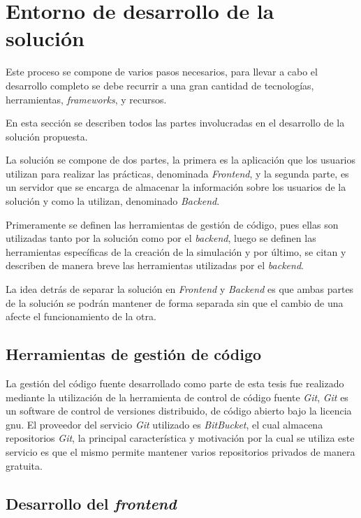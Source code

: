 \section{Entorno de desarrollo de la solución}

Este proceso se compone de varios pasos necesarios, para llevar a cabo el
desarrollo completo se debe recurrir a una gran cantidad de tecnologías,
herramientas, \textit{frameworks}, y recursos.

En esta sección se describen todos las partes involucradas en el desarrollo de
la solución propuesta. 

La solución se compone de dos partes, la primera es la aplicación que los
usuarios utilizan para realizar las prácticas, denominada \textit{Frontend}, y la segunda
parte, es un servidor que se encarga de almacenar la información sobre los
usuarios de la solución y como la utilizan, denominado \textit{Backend}.

Primeramente se definen las herramientas de gestión de código, pues ellas son
utilizadas tanto por la solución como por el \textit{backend}, luego se definen
las herramientas específicas de la creación de la simulación y por último, se
citan y describen de manera breve las herramientas utilizadas por el
\textit{backend}.

La idea detrás de separar la solución en \textit{Frontend} y \textit{Backend} 
es que ambas partes de la solución se podrán mantener de forma separada sin que 
el cambio de una afecte el funcionamiento de la otra. 

\subsection{Herramientas de gestión de código}

La gestión del código fuente desarrollado como parte de esta tesis fue realizado
mediante la utilización de la herramienta de control de código fuente
\textit{Git}, \textit{Git} es un software de control de versiones distribuido,
de código abierto bajo la licencia \Gls{gnu}\cite{git}. El proveedor del
servicio \textit{Git} utilizado es \textit{BitBucket}\cite{bitbucket}, el cual
almacena repositorios \textit{Git}, la principal característica y motivación por
la cual se utiliza este servicio es que el mismo permite mantener varios
repositorios privados de manera gratuita\cite{bitbucket}.

\subsection{Desarrollo del \textit{frontend}}

